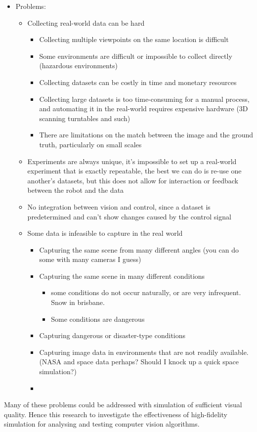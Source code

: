 \begin{itemize}
\item Problems:
	\begin{itemize}
	\item Collecting real-world data can be hard
		\begin{itemize}
		\item Collecting multiple viewpoints on the same location is difficult
		\item Some environments are difficult or impossible to collect directly (hazardous environments)
		\item Collecting datasets can be costly in time and monetary resources
		\item Collecting large datasets is too time-consuming for a manual process, and automating it in the real-world requires expensive hardware (3D scanning turntables and such)
		\item There are limitations on the match between the image and the ground truth, particularly on small scales
		\end{itemize}
	\item Experiments are always unique, it's impossible to set up a real-world experiment that is exactly repeatable, the best we can do is re-use one another's datasets, but this does not allow for interaction or feedback between the robot and the data
	\item No integration between vision and control, since a dataset is predetermined and can't show changes caused by the control signal
	\item Some data is infeasible to capture in the real world
	    \begin{itemize}
        \item Capturing the same scene from many different angles (you can do some with many cameras I guess)
        \item Capturing the same scene in many different conditions
        \begin{itemize}
            \item some conditions do not occur naturally, or are very infrequent. Snow in brisbane.
            \item Some conditions are dangerous 
        \end{itemize}
        \item Capturing dangerous or disaster-type conditions
        \item Capturing image data in environments that are not readily available. (NASA and space data perhaps? Should I knock up a quick space simulation?)
        \item 
	    \end{itemize}
    \end{itemize}
\end{itemize}
Many of these problems could be addressed with simulation of sufficient visual quality. Hence this research to investigate the effectiveness of high-fidelity simulation for analysing and testing computer vision algorithms.

